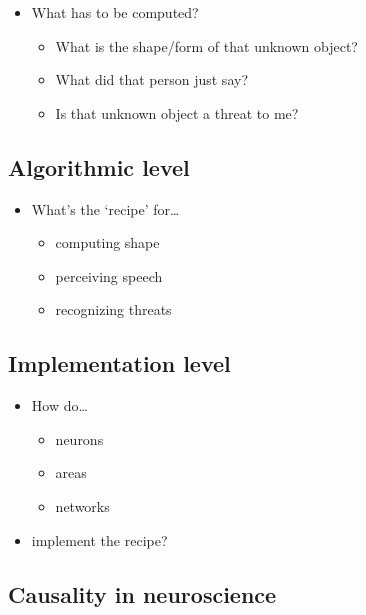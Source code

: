 \documentclass[
  letterpaper,
  DIV=11,
  numbers=noendperiod]{scrartcl}
\providecommand{\tightlist}{%
  \setlength{\itemsep}{0pt}\setlength{\parskip}{0pt}}
\begin{document}
\begin{itemize}
\tightlist
\item
  What has to be computed?

  \begin{itemize}
  \tightlist
  \item
    What is the shape/form of that unknown object?
  \item
    What did that person just say?
  \item
    Is that unknown object a threat to me?
  \end{itemize}
\end{itemize}

\subsection{Algorithmic level}\label{algorithmic-level}

\begin{itemize}
\tightlist
\item
  What's the `recipe' for\ldots{}

  \begin{itemize}
  \tightlist
  \item
    computing shape
  \item
    perceiving speech
  \item
    recognizing threats
  \end{itemize}
\end{itemize}

\subsection{Implementation level}\label{implementation-level}

\begin{itemize}
\tightlist
\item
  How do\ldots{}

  \begin{itemize}
  \tightlist
  \item
    neurons
  \item
    areas
  \item
    networks
  \end{itemize}
\item
  implement the recipe?
\end{itemize}

\subsection{Causality in neuroscience}\label{causality-in-neuroscience}
\end{document}
